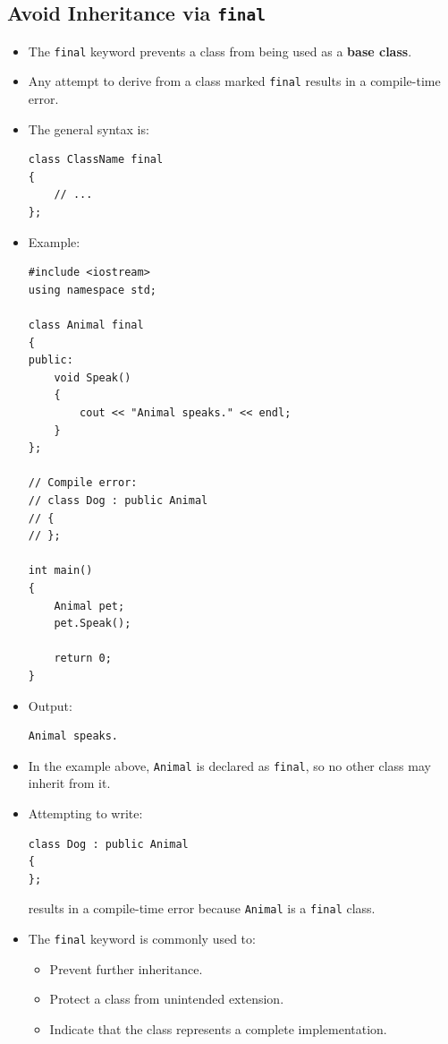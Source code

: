 \documentclass[10pt]{article}
\begin{document}
\subsection{Avoid Inheritance via \texttt{final}}
\begin{itemize}
    \item The \verb|final| keyword prevents a class from being used as a
    \textbf{base class}.

    \item Any attempt to derive from a class marked \verb|final| results in a
    compile-time error.

    \item The general syntax is:

\begin{verbatim}
class ClassName final
{
    // ...
};
\end{verbatim}

    \item Example:

\begin{verbatim}
#include <iostream>
using namespace std;

class Animal final
{
public:
    void Speak()
    {
        cout << "Animal speaks." << endl;
    }
};

// Compile error:
// class Dog : public Animal
// {
// };

int main()
{
    Animal pet;
    pet.Speak();

    return 0;
}
\end{verbatim}

    \item Output:

\begin{verbatim}
Animal speaks.
\end{verbatim}

    \item In the example above, \verb|Animal| is declared as
    \verb|final|, so no other class may inherit from it.

    \item Attempting to write:

\begin{verbatim}
class Dog : public Animal
{
};
\end{verbatim}

    results in a compile-time error because \verb|Animal| is a
    \verb|final| class.

    \item The \verb|final| keyword is commonly used to:
    \begin{itemize}
        \item Prevent further inheritance.
        \item Protect a class from unintended extension.
        \item Indicate that the class represents a complete implementation.
    \end{itemize}


\end{itemize}
\end{document}
